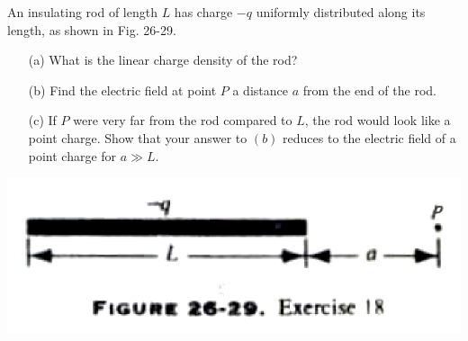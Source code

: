 \documentclass[11pt,letterpaper,boxed]{hmcpset}
\begin{document}
	\begin{solution}
		\vfill
	\end{solution}
	\newpage
	
	
	\begin{problem}[HRK E26.18*]
		An insulating rod of length $L$ has charge $-q$ uniformly distributed along its length, as shown in Fig. 26-29.
		
		\begin{enumerate}
			\item[(a)] What is the linear charge density of the rod?
			\item[(b)] Find the electric field at point $P$ a distance $a$ from the end of the rod.
			\item[(c)] If $P$ were very far from the rod compared to $L$, the rod would look like a point charge. Show that your answer to $(b)$ reduces to the electric field of a point charge for $a \gg L$.
		\end{enumerate}
		
		\begin{center}
			\includegraphics[scale=0.55]{26-29.png}
		\end{center}
	
		
	\end{problem}
	
	\begin{solution}
		\vfill
	\end{solution}
	\newpage
	
\end{document}
